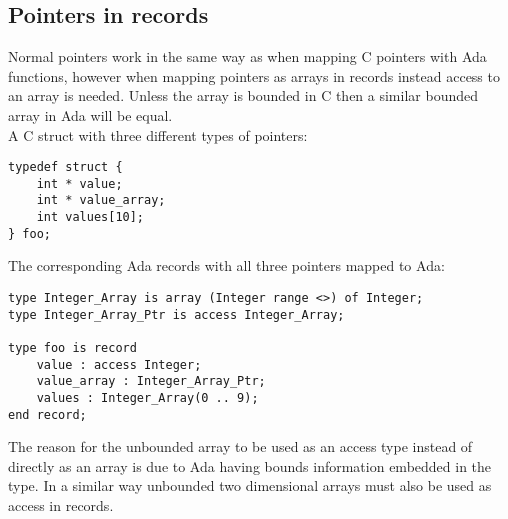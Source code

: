 \subsection{Pointers in records}\label{sec:ptrinrecord}
Normal pointers work in the same way as when mapping C pointers with Ada functions, however when mapping pointers as arrays in records instead access to an array is needed. Unless the array is bounded in C then a similar bounded array in Ada will be equal.
\\
A C struct with three different types of pointers:
\begin{lstlisting}
typedef struct {
	int * value;
	int * value_array;
	int values[10];
} foo;
\end{lstlisting}
The corresponding Ada records with all three pointers mapped to Ada:
\begin{lstlisting}
type Integer_Array is array (Integer range <>) of Integer;
type Integer_Array_Ptr is access Integer_Array;

type foo is record
	value : access Integer;
	value_array : Integer_Array_Ptr;
	values : Integer_Array(0 .. 9);
end record;
\end{lstlisting}
The reason for the unbounded array to be used as an access type instead of directly as an array is due to Ada having bounds information embedded in the type. In a similar way unbounded two dimensional arrays must also be used as access in records.
